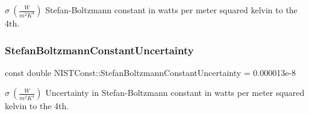 $\sigma \ (\frac{W}{m^2 K^4})$ Stefan-\/\+Boltzmann constant in watts per meter squared kelvin to the 4th. \mbox{\label{group___stefan_boltzmann_constant_ga98b40b4f7ea1cd358d0a140bf8f6973c}} 
\subsubsection{\texorpdfstring{Stefan\+Boltzmann\+Constant\+Uncertainty}{StefanBoltzmannConstantUncertainty}}
{\footnotesize\ttfamily const double N\+I\+S\+T\+Const\+::\+Stefan\+Boltzmann\+Constant\+Uncertainty = 0.\+000013e-\/8}

$\sigma \ (\frac{W}{m^2 K^4})$ Uncertainty in Stefan-\/\+Boltzmann constant in watts per meter squared kelvin to the 4th. 